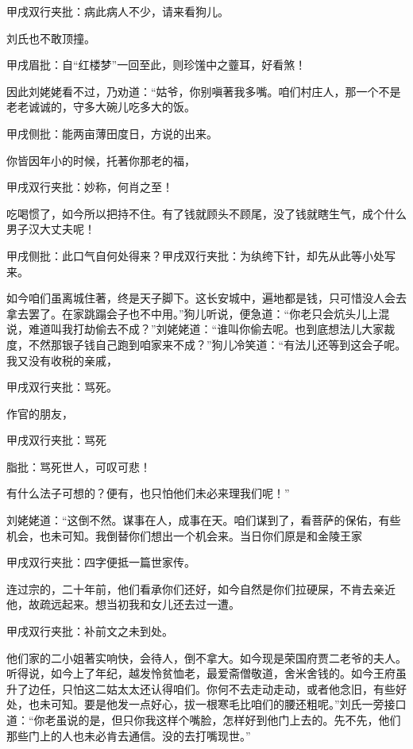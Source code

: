 \begin{parag}


    \begin{note}甲戌双行夹批：病此病人不少，请来看狗儿。\end{note}刘氏也不敢顶撞。\begin{note}甲戌眉批：自“红楼梦”一回至此，则珍馐中之虀耳，好看煞！\end{note}因此刘姥姥看不过，乃劝道：“姑爷，你别嗔著我多嘴。咱们村庄人，那一个不是老老诚诚的，守多大碗儿吃多大的饭。\begin{note}甲戌侧批：能两亩薄田度日，方说的出来。\end{note}你皆因年小的时候，托著你那老的福，\begin{note}甲戌双行夹批：妙称，何肖之至！\end{note}吃喝惯了，如今所以把持不住。有了钱就顾头不顾尾，没了钱就瞎生气，成个什么男子汉大丈夫呢！\begin{note}甲戌侧批：此口气自何处得来？甲戌双行夹批：为纨绔下针，却先从此等小处写来。\end{note}如今咱们虽离城住著，终是天子脚下。这长安城中，遍地都是钱，只可惜没人会去拿去罢了。在家跳蹋会子也不中用。”狗儿听说，便急道：“你老只会炕头儿上混说，难道叫我打劫偷去不成？”刘姥姥道：“谁叫你偷去呢。也到底想法儿大家裁度，不然那银子钱自己跑到咱家来不成？”狗儿冷笑道：“有法儿还等到这会子呢。我又没有收税的亲戚，\begin{note}甲戌双行夹批：骂死。\end{note}作官的朋友，\begin{note}甲戌双行夹批：骂死\end{note}\begin{note}脂批：骂死世人，可叹可悲！\end{note}有什么法子可想的？便有，也只怕他们未必来理我们呢！”
\end{parag}


\begin{parag}

    刘姥姥道：“这倒不然。谋事在人，成事在天。咱们谋到了，看菩萨的保佑，有些机会，也未可知。我倒替你们想出一个机会来。当日你们原是和金陵王家\begin{note}甲戌双行夹批：四字便抵一篇世家传。\end{note}连过宗的，二十年前，他们看承你们还好，如今自然是你们拉硬屎，不肯去亲近他，故疏远起来。想当初我和女儿还去过一遭。\begin{note}甲戌双行夹批：补前文之未到处。\end{note}他们家的二小姐著实响快，会待人，倒不拿大。如今现是荣国府贾二老爷的夫人。听得说，如今上了年纪，越发怜贫恤老，最爱斋僧敬道，舍米舍钱的。如今王府虽升了边任，只怕这二姑太太还认得咱们。你何不去走动走动，或者他念旧，有些好处，也未可知。要是他发一点好心，拔一根寒毛比咱们的腰还粗呢。”刘氏一旁接口道：“你老虽说的是，但只你我这样个嘴脸，怎样好到他门上去的。先不先，他们那些门上的人也未必肯去通信。没的去打嘴现世。”
\end{parag}


